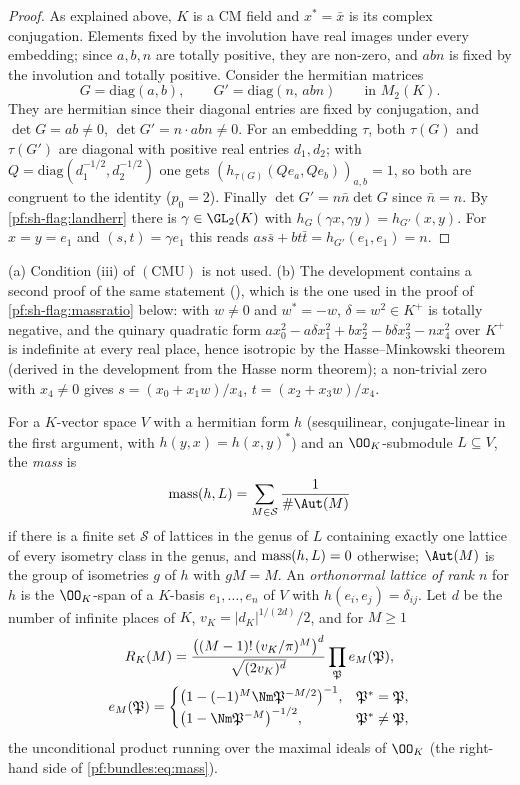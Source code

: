 \begin{proof}
As explained above, $K$ is a CM field and $x^*=\bar x$ is its complex conjugation. Elements fixed by the
involution have real images under every embedding; since $a,b,n$ are totally positive, they are non-zero, and
$abn$ is fixed by the involution and totally positive. Consider the hermitian matrices
\[
G=\mathrm{diag}(a,b),\qquad G'=\mathrm{diag}(n,\,abn)\qquad\text{in }M_2(K).
\]
They are hermitian since their diagonal entries are fixed by conjugation, and $\det G=ab\ne0$,
$\det G'=n\cdot abn\ne0$. For an embedding $\tau$, both $\tau(G)$ and $\tau(G')$ are diagonal with positive real
entries $d_1,d_2$; with $Q=\mathrm{diag}(d_1^{-1/2},d_2^{-1/2})$ one gets
$(h_{\tau(G)}(Qe_a,Qe_b))_{a,b}=1$, so both are congruent to the identity ($p_0=2$). Finally
$\det G'=n\bar n\det G$ since $\bar n=n$. By \cref{pf:sh-flag:landherr} there is $\gamma\in\GL_2(K)$ with
$h_G(\gamma x,\gamma y)=h_{G'}(x,y)$. For $x=y=e_1$ and $(s,t)=\gamma e_1$ this reads
$a s\bar s+b t\bar t=h_{G'}(e_1,e_1)=n$.
\end{proof}

\begin{remark}\label{pf:sh-flag:rem:hermrep}
(a) Condition (iii) of $(\mathrm{CMU})$ is not used. (b) The development contains a second proof of the same
statement (), which is the one used in the proof of
\cref{pf:sh-flag:massratio} below: with $w\ne0$ and $w^*=-w$, $\delta=w^2\in K^+$ is totally negative, and the
quinary quadratic form $ax_0^2-a\delta x_1^2+bx_2^2-b\delta x_3^2-nx_4^2$ over $K^+$ is indefinite at every real
place, hence isotropic by the Hasse--Minkowski theorem (derived in the development from the Hasse norm theorem);
a non-trivial zero with $x_4\ne0$ gives $s=(x_0+x_1w)/x_4$, $t=(x_2+x_3w)/x_4$.
\end{remark}

For a $K$-vector space $V$ with a hermitian form $h$ (sesquilinear, conjugate-linear in the first argument,
with $h(y,x)=h(x,y)^*$) and an $\OO_K$-submodule $L\subseteq V$, the \emph{mass} is
\[
\shflagmass(h,L)=\sum_{M\in\mathcal S}\frac1{\#\Aut(M)}
\]
if there is a finite set $\mathcal S$ of lattices in the genus of $L$ containing exactly one lattice of every
isometry class in the genus, and $\operatorname{mass}(h,L)=0$ otherwise; $\Aut(M)$ is the group of isometries $g$ of $h$
with $gM=M$. An \emph{orthonormal lattice of rank $n$} for $h$ is the $\OO_K$-span of a $K$-basis
$e_1,\dots,e_n$ of $V$ with $h(e_i,e_j)=\delta_{ij}$. Let $d$ be the number of infinite places of $K$,
$v_K=|d_K|^{1/(2d)}/2$, and for $M\ge1$
\begin{gather*}
R_K(M)=\frac{\bigl((M-1)!\,(v_K/\pi)^M\bigr)^d}{\sqrt{(2v_K)^d}}\prod_{\mathfrak P}e_M(\mathfrak P),\\
e_M(\mathfrak P)=\begin{cases}\bigl(1-(-1)^M\Nm\mathfrak P^{-M/2}\bigr)^{-1},&\mathfrak P^*=\mathfrak P,\\
\bigl(1-\Nm\mathfrak P^{-M}\bigr)^{-1/2},&\mathfrak P^*\ne\mathfrak P,\end{cases}
\end{gather*}
the unconditional product running over the maximal ideals of $\OO_K$ (the right-hand side of
\eqref{pf:bundles:eq:mass}).

